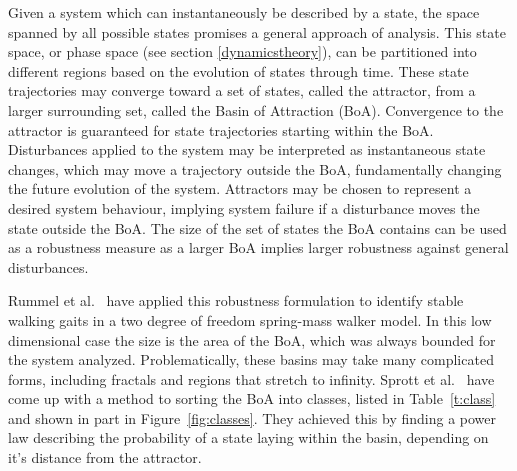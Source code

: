 Given a system which can instantaneously be described by a state, the space spanned by all possible states promises a general approach of analysis. This state space, or phase space (see section \ref{dynamicstheory}), can be partitioned into different regions based on the evolution of states through time. These state trajectories may converge toward a set of states, called the attractor, from a larger surrounding set, called the Basin of Attraction (BoA). Convergence to the attractor is guaranteed for state trajectories starting within the BoA. Disturbances applied to the system may be interpreted as instantaneous state changes, which may move a trajectory outside the BoA, fundamentally changing the future evolution of the system. Attractors may be chosen to represent a desired system behaviour, implying system failure if a disturbance moves the state outside the BoA. The size of the set of states the BoA contains can be used as a robustness measure as a larger BoA implies larger robustness against general disturbances. 

Rummel et al.\ \cite{walkbasin} have applied this robustness formulation to identify stable walking gaits in a two degree of freedom spring-mass walker model. In this low dimensional case the size is the area of the BoA, which was always bounded for the system analyzed. Problematically, these basins may take many complicated forms, including fractals and regions that stretch to infinity. Sprott et al.\ \cite{classify} have come up with a method to sorting the BoA into classes, listed in Table~\ref{t:class} and shown in part in Figure~\ref{fig:classes}. They achieved this by finding a power law describing the probability of a state laying within the basin, depending on it's distance from the attractor. 

